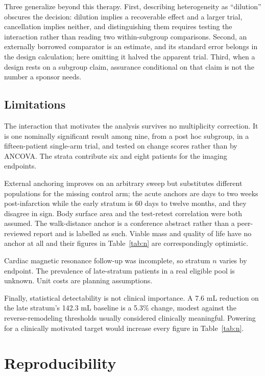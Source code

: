 \documentclass[10pt,twocolumn,letterpaper]{article}
\begin{document}
Three generalize beyond this therapy. First, describing heterogeneity as ``dilution'' obscures the
decision: dilution implies a recoverable effect and a larger trial, cancellation implies neither, and
distinguishing them requires testing the interaction rather than reading two within-subgroup
comparisons. Second, an externally borrowed comparator is an estimate, and its standard error belongs
in the design calculation; here omitting it halved the apparent trial. Third, when a design rests on
a subgroup claim, assurance conditional on that claim is not the number a sponsor needs.

\subsection{Limitations}

The interaction that motivates the analysis survives no multiplicity correction. It is one nominally
significant result among nine, from a post hoc subgroup, in a fifteen-patient single-arm trial, and
tested on change scores rather than by ANCOVA. The strata contribute six and eight patients for the
imaging endpoints.

External anchoring improves on an arbitrary sweep but substitutes different populations for the
missing control arm; the acute anchors are days to two weeks post-infarction while the early stratum
is 60 days to twelve months, and they disagree in sign. Body surface area and the test-retest
correlation were both assumed. The walk-distance anchor is a conference abstract rather than a
peer-reviewed report and is labelled as such. Viable mass and quality of life have no anchor at all
and their figures in Table~\ref{tab:n} are correspondingly optimistic.

Cardiac magnetic resonance follow-up was incomplete, so stratum $n$ varies by endpoint. The
prevalence of late-stratum patients in a real eligible pool is unknown. Unit costs are planning
assumptions.

Finally, statistical detectability is not clinical importance. A 7.6 mL reduction on the late
stratum's 142.3 mL baseline is a 5.3\% change, modest against the reverse-remodeling thresholds
usually considered clinically meaningful. Powering for a clinically motivated target would increase
every figure in Table~\ref{tab:n}.

\section{Reproducibility}
\end{document}
